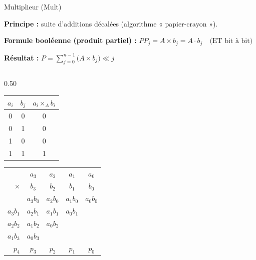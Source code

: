 \begin{frame}{Multiplieur (Mult)}

    \textbf{Principe :} suite
    d'additions décalées (algorithme « papier-crayon »).

    \vspace{0.2cm}

    \textbf{Formule booléenne (produit partiel) :}
    $PP_j = A \times b_j = A \cdot b_j \quad \text{(ET bit à bit)}$

    \textbf{Résultat :}
    $P = \sum_{j=0}^{n-1} \big( A \times b_j \big) \ll j$

    \begin{columns}
        \begin{column}{0.50\textwidth}
            \begin{center}
            \footnotesize

            \begin{tabular}{cc|c}
              \toprule
              $a_i$ & $b_j$ & $a_i \times_A b_i$ \\
              \midrule
              0 & 0 & 0 \\
              0 & 1 & 0 \\
              1 & 0 & 0 \\
              1 & 1 & 1 \\
              \bottomrule
            \end{tabular}

            \vspace{0.4cm}

            \begin{tabular}{r|cccc}
                & $a_3$ & $a_2$ & $a_1$ & $a_0$ \\
                $\times$ & $b_3$ & $b_2$ & $b_1$ & $b_0$ \\
                \midrule
                & $a_3 b_0$ & $a_2 b_0$ & $a_1 b_0$ & $a_0 b_0$ \\
                $a_3 b_1$ & $a_2 b_1$ & $a_1 b_1$ & $a_0 b_1$ & \\
                $a_2 b_2$ & $a_1 b_2$ & $a_0 b_2$ & &\\
                $a_1 b_3$ & $a_0 b_3$ & & &\\
                \bottomrule
                $p_4$ & $p_3$ & $p_2$ & $p_1$ & $p_0$ \\
            \end{tabular}
            \end{center}
        \end{column}


\end{columns}
\end{frame}
